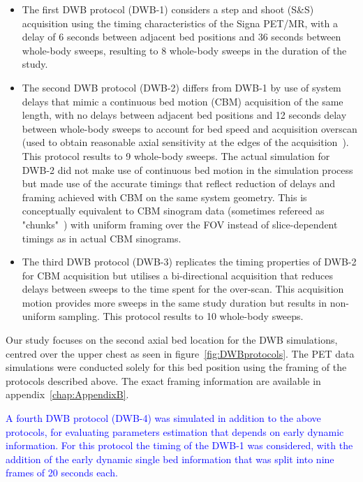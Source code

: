 \begin{itemize}
\item The first DWB protocol (DWB-1) considers a step and shoot (S\&S) acquisition using the timing characteristics of the Signa PET/MR, with a delay of 6 seconds between adjacent bed positions and 36 seconds between whole-body sweeps, resulting to 8 whole-body sweeps in the duration of the study. \\

\item The second DWB protocol (DWB-2) differs from DWB-1 by use of system delays that mimic a continuous bed motion (CBM) acquisition of the same length, with no delays between adjacent bed positions and 12 seconds delay between whole-body sweeps to account for bed speed and acquisition overscan (used to obtain reasonable axial sensitivity at the edges of the acquisition~\cite{Panin2014}). This protocol results to 9 whole-body sweeps. The actual simulation for DWB-2 did not make use of continuous bed motion in the simulation process but made use of the accurate timings that reflect reduction of delays and framing achieved with CBM on the same system geometry. This is conceptually equivalent to CBM sinogram data (sometimes refereed as "chunks"~\cite{Hu2014}) with uniform framing over the FOV instead of slice-dependent timings as in actual CBM sinograms. \\

\item The third DWB protocol (DWB-3) replicates the timing properties of DWB-2 for CBM acquisition but utilises a bi-directional acquisition that reduces delays between sweeps to the time spent for the over-scan. This acquisition motion provides more sweeps in the same study duration but results in non-uniform sampling. This protocol results to 10 whole-body sweeps.
\end{itemize}
\noindent 
Our study focuses on the second axial bed location for the DWB simulations, centred over the upper chest as seen in figure~\ref{fig:DWBprotocols}.
The PET data simulations were conducted solely for this bed position using the framing of the protocols described above. The exact framing information are available in appendix~\ref{chap:AppendixB}.%

\textcolor{blue}{
A fourth DWB protocol (DWB-4) was simulated in addition to the above protocols, for evaluating parameters estimation that depends on early dynamic information. For this protocol the timing of the DWB-1 was considered, with the addition of the early dynamic single bed information that was split into nine frames of 20 seconds each.}


